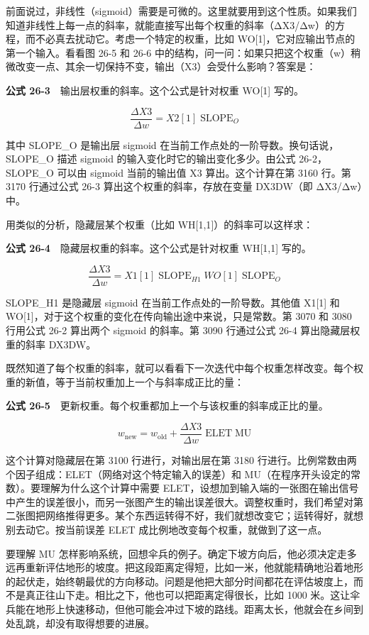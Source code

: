 前面说过，非线性（sigmoid）需要是可微的。这里就要用到这个性质。如果我们知道非线性上每一点的斜率，就能直接写出每个权重的斜率（ΔX3/Δw）的方程，而不必真去扰动它。考虑一个特定的权重，比如
WO{[}1{]}，它对应输出节点的第一个输入。看看图 26-5 和 26-6
中的结构，问一问：如果只把这个权重（w）稍微改变一点、其余一切保持不变，输出（X3）会受什么影响？答案是：

\textbf{公式 26-3}　输出层权重的斜率。这个公式是针对权重 WO{[}1{]}
写的。

\[\frac{\Delta X3}{\Delta w} = X2[1]\;\text{SLOPE}_O\]

其中 SLOPE\_O 是输出层 sigmoid
在当前工作点处的一阶导数。换句话说，SLOPE\_O 描述 sigmoid
的输入变化时它的输出变化多少。由公式 26-2，SLOPE\_O 可以由 sigmoid
当前的输出值 X3 算出。这个计算在第 3160 行。第 3170 行通过公式 26-3
算出这个权重的斜率，存放在变量 DX3DW（即 ΔX3/Δw）中。

用类似的分析，隐藏层某个权重（比如 WH{[}1,1{]}）的斜率可以这样求：

\textbf{公式 26-4}　隐藏层权重的斜率。这个公式是针对权重 WH{[}1,1{]}
写的。

\[\frac{\Delta X3}{\Delta w} = X1[1]\;\text{SLOPE}_{H1}\;WO[1]\;\text{SLOPE}_O\]

SLOPE\_H1 是隐藏层 sigmoid 在当前工作点处的一阶导数。其他值 X1{[}1{]} 和
WO{[}1{]}，对于这个权重的变化在传向输出途中来说，只是常数。第 3070 和
3080 行用公式 26-2 算出两个 sigmoid 的斜率。第 3090 行通过公式 26-4
算出隐藏层权重的斜率 DX3DW。

既然知道了每个权重的斜率，就可以看看下一次迭代中每个权重怎样改变。每个权重的新值，等于当前权重加上一个与斜率成正比的量：

\textbf{公式
26-5}　更新权重。每个权重都加上一个与该权重的斜率成正比的量。

\[w_{\text{new}} = w_{\text{old}} + \frac{\Delta X3}{\Delta w}\;\text{ELET}\;\text{MU}\]

这个计算对隐藏层在第 3100 行进行，对输出层在第 3180
行进行。比例常数由两个因子组成：ELET（网络对这个特定输入的误差）和
MU（在程序开头设定的常数）。要理解为什么这个计算中需要
ELET，设想加到输入端的一张图在输出信号中产生的误差很小，而另一张图产生的输出误差很大。调整权重时，我们希望对第二张图把网络推得更多。某个东西运转得不好，我们就想改变它；运转得好，就想别去动它。按当前误差
ELET 成比例地改变每个权重，就做到了这一点。

要理解 MU
怎样影响系统，回想伞兵的例子。确定下坡方向后，他必须决定走多远再重新评估地形的坡度。把这段距离定得短，比如一米，他就能精确地沿着地形的起伏走，始终朝最优的方向移动。问题是他把大部分时间都花在评估坡度上，而不是真正往山下走。相比之下，他也可以把距离定得很长，比如
1000
米。这让伞兵能在地形上快速移动，但他可能会冲过下坡的路线。距离太长，他就会在乡间到处乱跳，却没有取得想要的进展。


